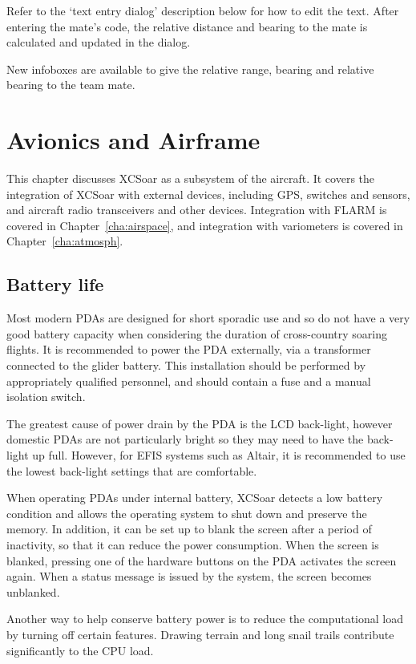 \documentclass[a4paper,12pt]{refrep}
\begin{document}
  Refer to the `text entry dialog' description below for how to edit
  the text.  After entering the mate's code, the relative distance and
  bearing to the mate is calculated and updated in the dialog.

  New infoboxes are available to give the relative range, bearing and relative
  bearing to the team mate.


\chapter{Avionics and Airframe}\label{cha:avionics-airframe}

This chapter discusses XCSoar as a subsystem of the aircraft.  It
covers the integration of XCSoar with external devices, including GPS,
switches and sensors, and aircraft radio transceivers and other
devices.  Integration with FLARM is covered in
Chapter~\ref{cha:airspace}, and integration with variometers is
covered in Chapter~\ref{cha:atmosph}.

\section{Battery life}

Most modern PDAs are designed for short sporadic use and so do not
have a very good battery capacity when considering the duration of
cross-country soaring flights.  It is recommended to power the PDA
externally, via a transformer connected to the glider battery.  This
installation should be performed by appropriately qualified personnel,
and should contain a fuse and a manual isolation switch.

The greatest cause of power drain by the PDA is the LCD back-light,
however domestic PDAs are not particularly bright so they may need to
have the back-light up full. However, for EFIS systems such as Altair,
it is recommended to use the lowest back-light settings that are
comfortable.

When operating PDAs under internal battery, XCSoar detects a low
battery condition and allows the operating system to shut down and
preserve the memory.  In addition, it can be set up to blank the
screen after a period of inactivity, so that it can reduce the power
consumption.  When the screen is blanked, pressing one of the hardware
buttons on the PDA activates the screen again.  When a status message
is issued by the system, the screen becomes unblanked.

Another way to help conserve battery power is to reduce the
computational load by turning off certain features.  Drawing terrain
and long snail trails contribute significantly to the CPU load.
\end{document}
